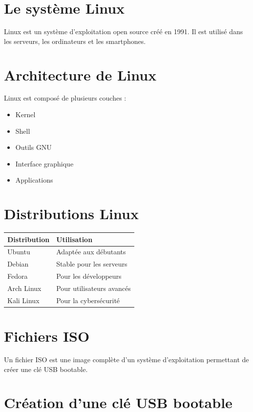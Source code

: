 \documentclass[12pt,a4paper]{report}
\begin{document}
\section{Le système Linux}

Linux est un système d’exploitation open source créé en 1991. Il est utilisé dans les serveurs, les ordinateurs et les smartphones.

\section{Architecture de Linux}

Linux est composé de plusieurs couches :

\begin{itemize}
    \item Kernel
    \item Shell
    \item Outils GNU
    \item Interface graphique
    \item Applications
\end{itemize}

\section{Distributions Linux}

\begin{longtable}{|p{4cm}|p{4cm}|}
\hline
Distribution & Utilisation \\
\hline
Ubuntu & Adaptée aux débutants \\
\hline
Debian & Stable pour les serveurs \\
\hline
Fedora & Pour les développeurs \\
\hline
Arch Linux & Pour utilisateurs avancés \\
\hline
Kali Linux & Pour la cybersécurité \\
\hline
\end{longtable}

\section{Fichiers ISO}

Un fichier ISO est une image complète d’un système d’exploitation permettant de créer une clé USB bootable.

\section{Création d’une clé USB bootable}
\end{document}
